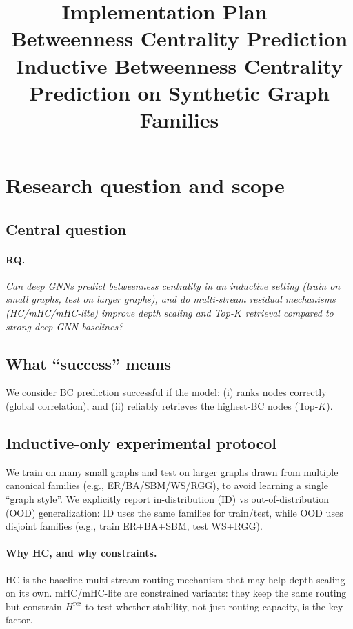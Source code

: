 \documentclass[11pt]{article}
\title{Implementation Plan — Betweenness Centrality Prediction\\
Inductive Betweenness Centrality Prediction on Synthetic Graph Families}
\author{}
\date{}
\begin{document}
\maketitle
\tableofcontents

\section{Research question and scope}
\subsection{Central question}
\paragraph{RQ.}
\emph{Can deep GNNs predict betweenness centrality in an inductive setting (train on small graphs, test on larger graphs), and do multi-stream residual mechanisms (HC/mHC/mHC-lite) improve depth scaling and Top-$K$ retrieval compared to strong deep-GNN baselines?}

\subsection{What “success” means}
We consider BC prediction successful if the model:
(i) ranks nodes correctly (global correlation), and
(ii) reliably retrieves the highest-BC nodes (Top-$K$).

\subsection{Inductive-only experimental protocol}
We train on many small graphs and test on larger graphs drawn from multiple canonical families (e.g., ER/BA/SBM/WS/RGG), to avoid learning a single “graph style”.
We explicitly report in-distribution (ID) vs out-of-distribution (OOD) generalization:
ID uses the same families for train/test, while OOD uses disjoint families (e.g., train ER+BA+SBM, test WS+RGG).

\paragraph{Why HC, and why constraints.}
HC is the baseline multi-stream routing mechanism that may help depth scaling on its own.
mHC/mHC-lite are constrained variants: they keep the same routing but constrain $H^{\mathrm{res}}$ to test whether stability, not just routing capacity, is the key factor.
\end{document}
